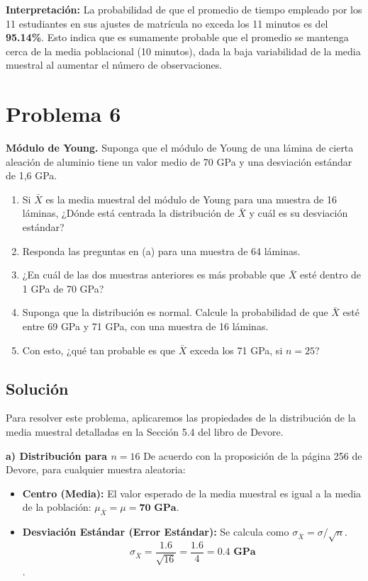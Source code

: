 \documentclass[a4paper]{article}
\begin{document}
\textbf{Interpretación:}
La probabilidad de que el promedio de tiempo empleado por los 11 estudiantes en sus ajustes de matrícula no exceda los 11 minutos es del \textbf{95.14\%}. Esto indica que es sumamente probable que el promedio se mantenga cerca de la media poblacional (10 minutos), dada la baja variabilidad de la media muestral al aumentar el número de observaciones.


\section{Problema 6}
\textbf{Módulo de Young.} Suponga que el módulo de Young de una lámina de cierta aleación de aluminio tiene un valor medio de 70 GPa y una desviación estándar de 1,6 GPa.

\begin{enumerate}
    \item[a)] Si $\bar{X}$ es la media muestral del módulo de Young para una muestra de 16 láminas, ¿Dónde está centrada la distribución de $\bar{X}$ y cuál es su desviación estándar?
    \item[b)] Responda las preguntas en (a) para una muestra de 64 láminas.
    \item[c)] ¿En cuál de las dos muestras anteriores es más probable que $\bar{X}$ esté dentro de 1 GPa de 70 GPa?
    \item[d)] Suponga que la distribución es normal. Calcule la probabilidad de que $\bar{X}$ esté entre 69 GPa y 71 GPa, con una muestra de 16 láminas.
    \item[e)] Con esto, ¿qué tan probable es que $\bar{X}$ exceda los 71 GPa, si $n = 25$?
\end{enumerate}

\subsection{Solución}

Para resolver este problema, aplicaremos las propiedades de la distribución de la media muestral detalladas en la Sección 5.4 del libro de Devore.

\textbf{a) Distribución para $n = 16$}
De acuerdo con la proposición de la página 256 de Devore, para cualquier muestra aleatoria:
\begin{itemize}
    \item \textbf{Centro (Media):} El valor esperado de la media muestral es igual a la media de la población: $\mu_{\bar{X}} = \mu = \mathbf{70 \text{ GPa}}$.
    \item \textbf{Desviación Estándar (Error Estándar):} Se calcula como $\sigma_{\bar{X}} = \sigma / \sqrt{n}$.
    $$\sigma_{\bar{X}} = \frac{1.6}{\sqrt{16}} = \frac{1.6}{4} = \mathbf{0.4 \text{ GPa}}$$.
\end{itemize}
\end{document}
